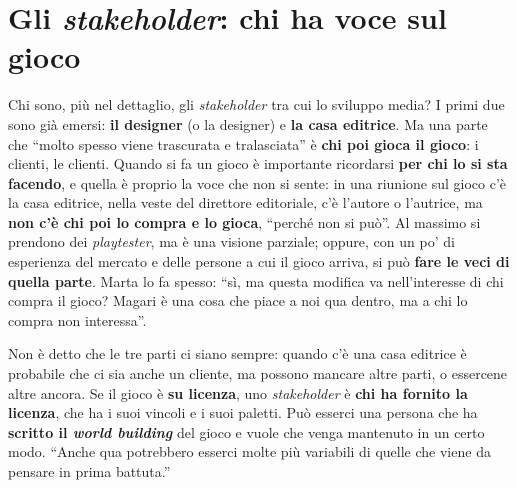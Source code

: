 \section{Gli \emph{stakeholder}: chi ha voce sul gioco}
\label{a13:sec:stakeholder}



Chi sono, più nel dettaglio, gli \emph{stakeholder} tra cui lo sviluppo media? I primi
due sono già emersi: \textbf{il designer} (o la designer) e \textbf{la casa editrice}. Ma
una parte che ``molto spesso viene trascurata e tralasciata'' è \textbf{chi poi gioca il
gioco}: i clienti, le clienti. Quando si fa un gioco è importante ricordarsi \textbf{per
chi lo si sta facendo}, e quella è proprio la voce che non si sente: in una riunione
sul gioco c'è la casa editrice, nella veste del direttore editoriale, c'è l'autore o
l'autrice, ma \textbf{non c'è chi poi lo compra e lo gioca}, ``perché non si può''. Al
massimo si prendono dei \emph{playtester}, ma è una visione parziale; oppure, con un po'
di esperienza del mercato e delle persone a cui il gioco arriva, si può \textbf{fare le
veci di quella parte}. Marta lo fa spesso: ``sì, ma questa modifica va nell'interesse di
chi compra il gioco? Magari è una cosa che piace a noi qua dentro, ma a chi lo compra non
interessa''.

Non è detto che le tre parti ci siano sempre: quando c'è una casa editrice è probabile
che ci sia anche un cliente, ma possono mancare altre parti, o essercene altre ancora.
Se il gioco è \textbf{su licenza}, uno \emph{stakeholder} è \textbf{chi ha fornito la
licenza}, che ha i suoi vincoli e i suoi paletti. Può esserci una persona che ha
\textbf{scritto il \emph{world building}} del gioco e vuole che venga mantenuto in un
certo modo. ``Anche qua potrebbero esserci molte più variabili di quelle che viene da
pensare in prima battuta.''


